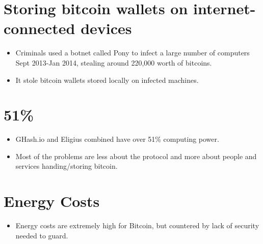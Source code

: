 \documentclass{article}
\begin{document}
\section*{Storing bitcoin wallets on internet-connected devices}
\begin{itemize}
  \item Criminals used a botnet called Pony to infect a large number of computers Sept 2013-Jan 2014, stealing around 220,000 worth of bitcoins.
  \item It stole bitcoin wallets stored locally on infected machines. 
\end{itemize}

\section*{51\%}
\begin{itemize}
  \item GHash.io and Eligius combined have over 51\% computing power.
  \item Most of the problems are less about the protocol and more about people and services handing/storing bitcoin.
\end{itemize}

\section*{Energy Costs}
\begin{itemize}
  \item Energy costs are extremely high for Bitcoin, but countered by lack of security needed to guard.
\end{itemize}
\end{document}
